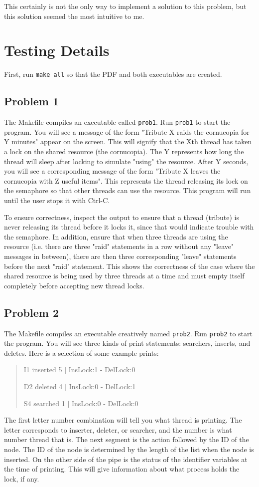 \documentclass[letterpaper,10pt,titlepage]{article}
\begin{document}
This certainly is not the only way to implement a solution to this problem, but this solution seemed the most intuitive to me.

\section{Testing Details}
First, run \verb|make all| so that the PDF and both executables are created.

\subsection{Problem 1}
The Makefile compiles an executable called \verb|prob1|.
Run \verb|prob1| to start the program.
You will see a message of the form "Tribute X raids the cornucopia for Y
minutes" appear on the screen.
This will signify that the Xth thread has taken a lock on the shared
resource (the cornucopia). The Y represents how long the thread will
sleep after locking to simulate "using" the resource.
After Y seconds, you will see a corresponding message of the form
"Tribute X leaves the cornucopia with Z useful items".
This represents the thread releasing its lock on the semaphore
so that other threads can use the resource.
This program will run until the user stops it with Ctrl-C.

To ensure correctness, inspect the output to ensure that a thread (tribute)
is never releasing its thread before it locks it, since that would indicate
trouble with the semaphore.
In addition, ensure that when three threads are using the resource (i.e. there
are three "raid" statements in a row without any "leave" messages in between),
there are then three corresponding "leave" statements before the next "raid"
statement.
This shows the correctness of the case where the shared resource is being used
by three threads at a time and must empty itself completely before accepting
new thread locks.

\subsection{Problem 2}
The Makefile compiles an executable creatively named \verb|prob2|.
Run \verb|prob2| to start the program.
You will see three kinds of print statements: searchers, inserts, and deletes.
Here is a selection of some example prints:
\begin{quote}
	I1 inserted 5           $|$               InsLock:1 - DelLock:0

	D2 deleted  4           $|$               InsLock:0 - DelLock:1

	S4 searched 1           $|$               InsLock:0 - DelLock:0
\end{quote}
The first letter number combination will tell you what thread is printing.
The letter corresponds to inserter, deleter, or searcher, and the number is what number thread that is.
The next segment is the action followed by the ID of the node.
The ID of the node is determined by the length of the list when the node is inserted.
On the other side of the pipe is the status of the identifier variables at the time of printing.
This will give information about what process holds the lock, if any.
\end{document}
